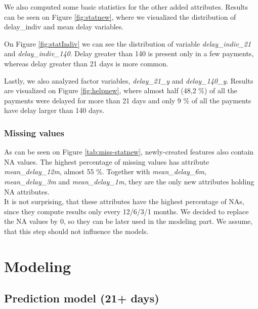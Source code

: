\documentclass[
]{article}
\begin{document}
We also computed some basic statistics for the other added attributes.
Results can be seen on Figure \ref{fig:statnew}, where we visualized the distribution of delay\_indiv and mean delay variables.

On Figure \ref{fig:statIndiv} we can see the distribution of variable \emph{delay\_indiv\_21} and \emph{delay\_indiv\_140}. Delay greater than 140 is present only in a few payments, whereas delay greater than 21 days is more common.

Lastly, we also analyzed factor variables, \emph{delay\_21\_y} and \emph{delay\_140\_y}. Results are visualized on Figure \ref{fig:helpnew}, where almost half (48,2 \%) of all the payments were delayed for more than 21 days and only 9 \% of all the payments have delay larger than 140 days.

\hypertarget{missing-values-1}{%
\subsubsection{Missing values}\label{missing-values-1}}

As can be seen on Figure \ref{tab:miss-statnew}, newly-created features also contain NA values. The highest percentage of missing values has attribute \emph{mean\_delay\_12m}, almost 55 \%. Together with \emph{mean\_delay\_6m}, \emph{mean\_delay\_3m} and \emph{mean\_delay\_1m}, they are the only new attributes holding NA attributes.\\
It is not surprising, that these attributes have the highest percentage of NAs, since they compute results only every 12/6/3/1 months. We decided to replace the NA values by 0, so they can be later used in the modeling part. We assume, that this step should not influence the models.

\hypertarget{modeling}{%
\section{Modeling}\label{modeling}}

\hypertarget{prediction-model-21-days}{%
\subsection{Prediction model (21+ days)}\label{prediction-model-21-days}}
\end{document}
